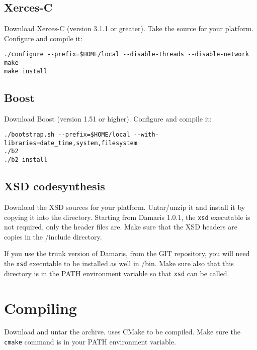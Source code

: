 \subsection{Xerces-C}

Download Xerces-C (version 3.1.1 or greater). Take the source for your platform.
Configure and compile it:

\begin{verbatim}
./configure --prefix=$HOME/local --disable-threads --disable-network
make
make install
\end{verbatim}

\subsection{Boost}

Download Boost (version 1.51 or higher). Configure and compile it:

\begin{verbatim}
./bootstrap.sh --prefix=$HOME/local --with-libraries=date_time,system,filesystem 
./b2
./b2 install
\end{verbatim}

\subsection{XSD codesynthesis}

Download the XSD sources for your platform.
Untar/unzip it and install it by copying it into the \installdir directory.
Starting from Damaris 1.0.1, the \texttt{xsd} executable is not required, only the header
files are. Make sure that the XSD headers are copies in the \installdir/include directory.

If you use the trunk version of Damaris, from the GIT repository, you will need the \texttt{xsd}
executable to be installed as well in \installdir/bin. Make sure also that this directory is in the PATH environment variable
so that \texttt{xsd} can be called.


\section{Compiling \Damaris{}}

Download and untar the \Damaris{} archive. \Damaris{} uses CMake to be compiled.
Make sure the \texttt{cmake} command is in your PATH environment variable.


